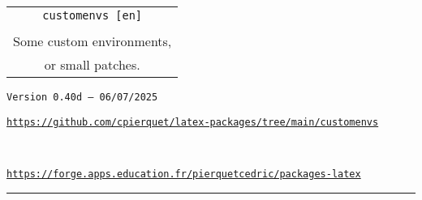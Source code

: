 \documentclass[english,11pt,a4paper]{article}
\def\TPversion{0.40d}
\def\TPdate{06/07/2025}
\begin{document}
\pagestyle{fancy}

\thispagestyle{empty}

\begin{center}
	\begin{minipage}{0.75\linewidth}
	\begin{tcolorbox}[colframe=yellow,colback=yellow!15]
		\begin{center}
			\renewcommand\arraystretch{1.25}
			\begin{tabular}{c}
				{\Huge \texttt{customenvs [en]}}\\
				\\
				{\Large Some custom environments,} \\
				{\Large or small patches.} \\
			\end{tabular}
			\renewcommand\arraystretch{1}
			
			\medskip
			
			{\small \texttt{Version \TPversion{} -- \TPdate}}
		\end{center}
	\end{tcolorbox}
\end{minipage}
\end{center}

\begin{center}
\begin{minipage}{0.85\linewidth}
	\begin{tcolorbox}[colframe=teal,colback=teal!10,halign=center,fontupper=\footnotesize]
		\texttt{\url{https://github.com/cpierquet/latex-packages/tree/main/customenvs}}
		
		~
		
		\texttt{\url{https://forge.apps.education.fr/pierquetcedric/packages-latex}}
	\end{tcolorbox}
\end{minipage}
\end{center}

\vspace*{5mm}

%
%
%
%
%

\hrule


\end{document}
